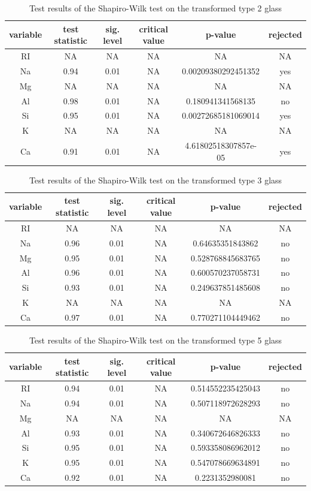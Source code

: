 \documentclass[a4paper, 12pt, titlepage, headsepline, listof = totoc, bibliography = totoc, numbers = noenddot]{scrartcl}
\begin{document}
\begin{table}[h!]
\centering
\begin{tabular}{|cccccc|} \hline variable & test statistic & sig. level & critical value & p-value & rejected\\ \hline RI & NA & NA & NA & NA & NA\\ 
Na & 0.94 & 0.01 & NA & 0.00209380292451352 & yes\\ 
Mg & NA & NA & NA & NA & NA\\ 
Al & 0.98 & 0.01 & NA & 0.180941341568135 & no\\ 
Si & 0.95 & 0.01 & NA & 0.00272685181069014 & yes\\ 
K & NA & NA & NA & NA & NA\\ 
Ca & 0.91 & 0.01 & NA & 4.61802518307857e-05 & yes\\ \hline \end{tabular}\caption{Test results of the Shapiro-Wilk test on the transformed type 2 glass}
\label{tab:testrestype2SWtrans}
\end{table}

\begin{table}[h!]
\centering
\begin{tabular}{|cccccc|} \hline variable & test statistic & sig. level & critical value & p-value & rejected\\ \hline RI & NA & NA & NA & NA & NA\\ 
Na & 0.96 & 0.01 & NA & 0.64635351843862 & no\\ 
Mg & 0.95 & 0.01 & NA & 0.528768845683765 & no\\ 
Al & 0.96 & 0.01 & NA & 0.600570237058731 & no\\ 
Si & 0.93 & 0.01 & NA & 0.249637851485608 & no\\ 
K & NA & NA & NA & NA & NA\\ 
Ca & 0.97 & 0.01 & NA & 0.770271104449462 & no\\ \hline \end{tabular}\caption{Test results of the Shapiro-Wilk test on the transformed type 3 glass}
\label{tab:testrestype3SWtrans}
\end{table}

\begin{table}[h!]
\centering
\begin{tabular}{|cccccc|} \hline variable & test statistic & sig. level & critical value & p-value & rejected\\ \hline RI & 0.94 & 0.01 & NA & 0.514552235425043 & no\\ 
Na & 0.94 & 0.01 & NA & 0.507118972628293 & no\\ 
Mg & NA & NA & NA & NA & NA\\ 
Al & 0.93 & 0.01 & NA & 0.340672646826333 & no\\ 
Si & 0.95 & 0.01 & NA & 0.593358086962012 & no\\ 
K & 0.95 & 0.01 & NA & 0.547078669634891 & no\\ 
Ca & 0.92 & 0.01 & NA & 0.2231352980081 & no\\ \hline \end{tabular}\caption{Test results of the Shapiro-Wilk test on the transformed type 5 glass}
\label{tab:testrestype5SWtrans}
\end{table}
\end{document}
